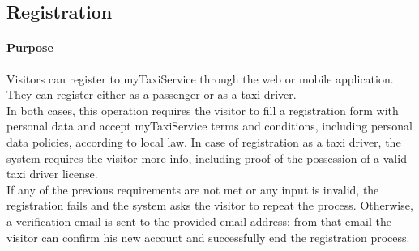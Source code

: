 \subsection{Registration}
\paragraph{Purpose}
	Visitors can register to myTaxiService through the web or mobile application. They can register either as a passenger or as a taxi driver.\\
	In both cases, this operation requires the visitor to fill a registration form with personal data and accept myTaxiService terms and conditions, including personal data policies, according to local law. In case of registration as a taxi driver, the system requires the visitor more info, including proof of the possession of a valid taxi driver license.\\
	If any of the previous requirements are not met or any input is invalid, the registration fails and the system asks the visitor to repeat the process. Otherwise, a verification email is sent to the provided email address: from that email the visitor can confirm his new account and successfully end the registration process.

